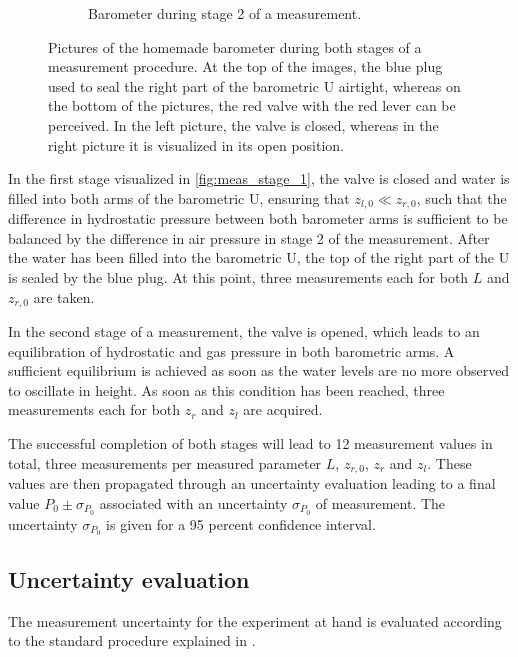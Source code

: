 \documentclass[a4paper,11pt, twocolumn]{article}
\begin{document}
\begin{figure}[h!]
\begin{subfigure}{0.22\textwidth}
		\caption{Barometer during stage 2 of a measurement.}
		\label{fig:meas_stage_2}
	\end{subfigure}
	\caption{Pictures of the homemade barometer during both stages of a measurement procedure. At the top of the images, the blue plug used to seal the right part of the barometric U airtight, whereas on the bottom of the pictures, the red valve with the red lever can be perceived. In the left picture, the valve is closed, whereas in the right picture it is visualized in its open position.}
	\label{fig:measurement_procedure}
\end{figure}

In the first stage visualized in \cref{fig:meas_stage_1}, the valve is closed and water is filled into both arms of the barometric U, ensuring that $z_{l,0} \ll z_{r,0}$, such that the difference in hydrostatic pressure between both barometer arms is sufficient to be balanced by the difference in air pressure in stage 2 of the measurement. After the water has been filled into the barometric U, the top of the right part of the U is sealed by the blue plug. At this point, three measurements each for both $L$ and $z_{r,0}$ are taken.

In the second stage of a measurement, the valve is opened, which leads to an equilibration of hydrostatic and gas pressure in both barometric arms. A sufficient equilibrium is achieved as soon as the water levels are no more observed to oscillate in height. As soon as this condition has been reached, three measurements each for both $z_r$ and $z_l$ are acquired.

The successful completion of both stages will lead to 12 measurement values in total, three measurements per measured parameter $L$, $z_{r,0}$, $z_r$ and $z_l$. These values are then propagated through an uncertainty evaluation leading to a final value $P_0 \pm \sigma_{P_0}$ associated with an uncertainty $\sigma_{P_0}$ of measurement. The uncertainty $\sigma_{P_0}$ is given for a 95 percent confidence interval. 

\subsection{Uncertainty evaluation}
The measurement uncertainty for the experiment at hand is evaluated according to the standard procedure explained in \cite{GUM2023}.
\end{document}
